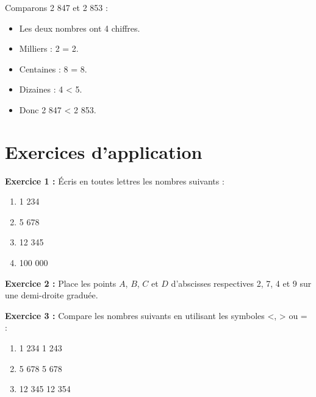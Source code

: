 \begin{examplebox}
  Comparons 2 847 et 2 853 :
  \begin{itemize}
    \item Les deux nombres ont 4 chiffres.
    \item Milliers : 2 = 2.
    \item Centaines : 8 = 8.
    \item Dizaines : 4 < 5.
    \item Donc 2 847 < 2 853.
  \end{itemize}
\end{examplebox}


\section{Exercices d'application}

\begin{exercisebox}
  \textbf{Exercice 1 :} Écris en toutes lettres les nombres suivants :
  \begin{enumerate}
    \item 1 234
    \item 5 678
    \item 12 345
    \item 100 000
  \end{enumerate}
\end{exercisebox}

\begin{exercisebox}
  \textbf{Exercice 2 :} Place les points $A$, $B$, $C$ et $D$ d'abscisses respectives 2, 7, 4 et 9 sur une demi-droite graduée.
\end{exercisebox}

\begin{exercisebox}
  \textbf{Exercice 3 :} Compare les nombres suivants en utilisant les symboles <, > ou = :
  \begin{enumerate}
    \item 1 234 \trous{1cm} 1 243
    \item 5 678 \trous{1cm} 5 678
    \item 12 345 \trous{1cm} 12 354
  \end{enumerate}
\end{exercisebox}

